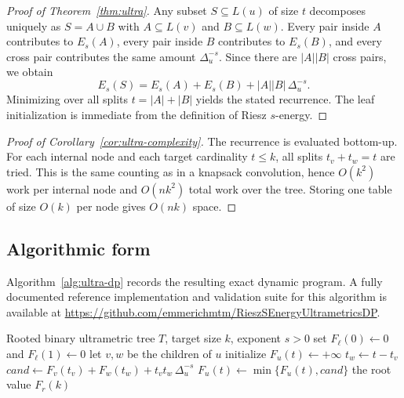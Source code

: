 \documentclass[11pt]{article}
\begin{document}
\begin{proof}[Proof of Theorem~\ref{thm:ultra}]
Any subset $S\subseteq L(u)$ of size $t$ decomposes uniquely as $S=A\cup B$ with $A\subseteq L(v)$ and $B\subseteq L(w)$. Every pair inside $A$ contributes to $E_s(A)$, every pair inside $B$ contributes to $E_s(B)$, and every cross pair contributes the same amount $\Delta_u^{-s}$. Since there are $|A||B|$ cross pairs, we obtain
\[
E_s(S)=E_s(A)+E_s(B)+|A||B|\,\Delta_u^{-s}.
\]
Minimizing over all splits $t=|A|+|B|$ yields the stated recurrence. The leaf initialization is immediate from the definition of Riesz $s$-energy.
\end{proof}

\begin{proof}[Proof of Corollary~\ref{cor:ultra-complexity}]
The recurrence is evaluated bottom-up. For each internal node and each target cardinality $t\le k$, all splits $t_v+t_w=t$ are tried. This is the same counting as in a knapsack convolution, hence $O(k^2)$ work per internal node and $O(nk^2)$ total work over the tree. Storing one table of size $O(k)$ per node gives $O(nk)$ space.
\end{proof}

\subsection{Algorithmic form}

Algorithm~\ref{alg:ultra-dp} records the resulting exact dynamic program.  A fully documented reference implementation and validation suite for this
algorithm is available at
\url{https://github.com/emmerichmtm/RieszSEnergyUltrametricsDP}.

\begin{algorithm}[h]
\caption{Exact DP for minimum Riesz $s$-energy subset selection on a rooted binary ultrametric tree}
\label{alg:ultra-dp}
\begin{algorithmic}[1]
\Require Rooted binary ultrametric tree $T$, target size $k$, exponent $s>0$
    \State set $F_\ell(0)\gets 0$ and $F_\ell(1)\gets 0$
\EndFor
{}
    \State let $v,w$ be the children of $u$
        \State initialize $F_u(t)\gets +\infty$
            \State $t_w\gets t-t_v$
            \State $cand\gets F_v(t_v)+F_w(t_w)+t_v t_w\,\Delta_u^{-s}$
            \State $F_u(t)\gets \min\{F_u(t),cand\}$
        \EndFor
    \EndFor
\EndFor
\State \Return the root value $F_r(k)$
\end{algorithmic}
\end{algorithm}
\end{document}
